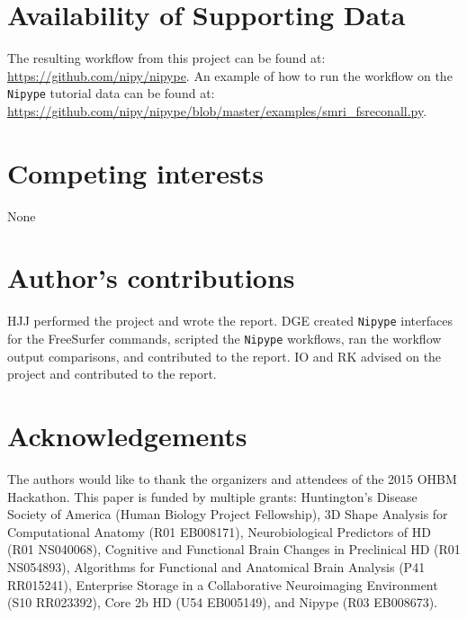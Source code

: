 \documentclass[twocolumn]{bmcart}%
\newcommand{\projURL}{https://github.com/nipy/nipype}
\begin{document}
\begin{backmatter}

\section*{Availability of Supporting Data}
The resulting workflow from this project can be found at: \url{\projURL}. An example of how to run the workflow on the \texttt{Nipype} tutorial data can be found at: \url{https://github.com/nipy/nipype/blob/master/examples/smri_fsreconall.py}.

\section*{Competing interests}
None

\section*{Author's contributions}
HJJ performed the project and wrote the report.
DGE created \texttt{Nipype} interfaces for the FreeSurfer commands, scripted the \texttt{Nipype} workflows, ran the workflow output comparisons, and contributed to the report. IO and RK advised on the project and contributed to the report.

\section*{Acknowledgements}
The authors would like to thank the organizers and attendees of the 2015 OHBM Hackathon.
This paper is funded by multiple grants: Huntington’s Disease Society of America (Human Biology Project Fellowship),   3D Shape Analysis for Computational Anatomy (R01 EB008171), Neurobiological Predictors of HD (R01 NS040068), Cognitive and Functional Brain Changes in Preclinical HD (R01 NS054893), Algorithms for Functional and Anatomical Brain Analysis (P41 RR015241), Enterprise Storage in a Collaborative Neuroimaging Environment (S10 RR023392), Core 2b HD (U54 EB005149), and Nipype (R03 EB008673).



\end{backmatter}
\end{document}
